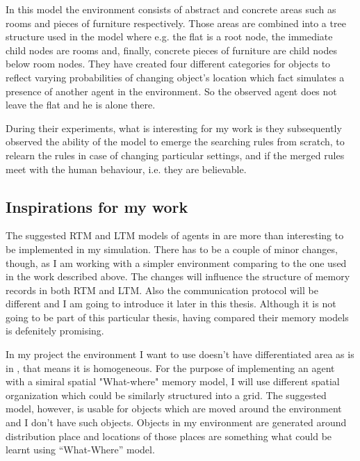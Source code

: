 In this model the environment consists of abstract and concrete areas such as rooms and pieces of furniture respectively. Those areas are combined into a tree structure used in the model where e.g. the flat is a root node, the immediate child nodes are rooms and, finally, concrete pieces of furniture are child nodes below room nodes. They have created four different categories for objects to reflect varying probabilities of changing object’s location which fact simulates a presence of another agent in the environment. So the observed agent does not leave the flat and he is alone there.

During their experiments, what is interesting for my work is they subsequently observed the ability of the model to emerge the searching rules from scratch, to relearn the rules in case of changing particular settings, and if the merged rules meet with the human behaviour, i.e. they are believable. 
                 
\subsection{Inspirations for my work}

The suggested RTM and LTM models of agents in \cite{Ho:memoryarchitectures} are more than interesting to be implemented in my simulation. There has to be a couple of minor changes, though, as I am working with a simpler environment comparing to the one used in the work described above. The changes will influence the structure of memory records in both RTM and LTM. Also the communication protocol will be different and I am going to introduce it later in this thesis. Although it is not going to be part of this particular thesis, having compared their memory models is defenitely promising.

In my project the environment I want to use doesn’t have differentiated area as is in \cite{Brom:placeandobjects}, that means it is homogeneous. For the purpose of implementing an agent with a simiral spatial "What-where" memory model, I will use different spatial organization which could be similarly structured into a grid.  The suggested model, however, is usable for objects which are moved around the environment and I don’t have such objects. Objects in my environment are generated around distribution place and locations of those places are something what could be learnt using “What-Where” model. 
